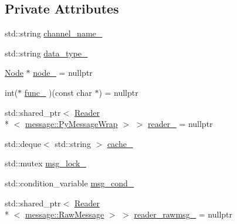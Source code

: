 \subsection*{Private Attributes}
\begin{DoxyCompactItemize}
\item 
std\-::string \hyperlink{classapollo_1_1cyber_1_1PyReader_ad351960d55897e870477559d435edf44}{channel\-\_\-name\-\_\-}
\item 
std\-::string \hyperlink{classapollo_1_1cyber_1_1PyReader_ad76d5814bde082f4cfb80a6530e8fea2}{data\-\_\-type\-\_\-}
\item 
\hyperlink{classapollo_1_1cyber_1_1Node}{Node} $\ast$ \hyperlink{classapollo_1_1cyber_1_1PyReader_a536eec8704c82a257a9d5055ce423186}{node\-\_\-} = nullptr
\item 
int($\ast$ \hyperlink{classapollo_1_1cyber_1_1PyReader_a5ac7fd363685049b09cb164e44b94290}{func\-\_\-} )(const char $\ast$) = nullptr
\item 
std\-::shared\-\_\-ptr$<$ \hyperlink{classapollo_1_1cyber_1_1Reader}{Reader}\\*
$<$ \hyperlink{classapollo_1_1cyber_1_1message_1_1PyMessageWrap}{message\-::\-Py\-Message\-Wrap} $>$ $>$ \hyperlink{classapollo_1_1cyber_1_1PyReader_abf457a5943e3bb6e4ad42349ff864688}{reader\-\_\-} = nullptr
\item 
std\-::deque$<$ std\-::string $>$ \hyperlink{classapollo_1_1cyber_1_1PyReader_a5d52ffc981f3a9f4a73db50a0e581951}{cache\-\_\-}
\item 
std\-::mutex \hyperlink{classapollo_1_1cyber_1_1PyReader_a65d8b0d144d43363766a7b30739d3ae9}{msg\-\_\-lock\-\_\-}
\item 
std\-::condition\-\_\-variable \hyperlink{classapollo_1_1cyber_1_1PyReader_afef93e420ce1fe81783ee2e533aff74b}{msg\-\_\-cond\-\_\-}
\item 
std\-::shared\-\_\-ptr$<$ \hyperlink{classapollo_1_1cyber_1_1Reader}{Reader}\\*
$<$ \hyperlink{structapollo_1_1cyber_1_1message_1_1RawMessage}{message\-::\-Raw\-Message} $>$ $>$ \hyperlink{classapollo_1_1cyber_1_1PyReader_a314d7f61cb04390baf3cb2cf113b3020}{reader\-\_\-rawmsg\-\_\-} = nullptr
\end{DoxyCompactItemize}


